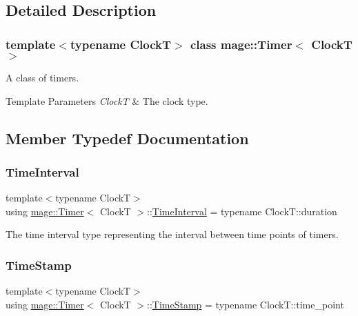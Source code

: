 \subsection{Detailed Description}
\subsubsection*{template$<$typename ClockT$>$\newline
class mage\+::\+Timer$<$ Clock\+T $>$}

A class of timers.


\begin{DoxyTemplParams}{Template Parameters}
{\em ClockT} & The clock type. \\
\hline
\end{DoxyTemplParams}


\subsection{Member Typedef Documentation}
\hypertarget{classmage_1_1_timer_a5c0fd78ceab0110637622bd0e9b8424d}{}\label{classmage_1_1_timer_a5c0fd78ceab0110637622bd0e9b8424d} 
\subsubsection{\texorpdfstring{Time\+Interval}{TimeInterval}}
{\footnotesize\ttfamily template$<$typename ClockT$>$ \\
using \hyperlink{classmage_1_1_timer}{mage\+::\+Timer}$<$ ClockT $>$\+::\hyperlink{classmage_1_1_timer_a5c0fd78ceab0110637622bd0e9b8424d}{Time\+Interval} =  typename Clock\+T\+::duration\hspace{0.3cm}{\ttfamily [private]}}

The time interval type representing the interval between time points of timers. \hypertarget{classmage_1_1_timer_abd11aea6107940b09ef3c48f62c81668}{}\label{classmage_1_1_timer_abd11aea6107940b09ef3c48f62c81668} 
\subsubsection{\texorpdfstring{Time\+Stamp}{TimeStamp}}
{\footnotesize\ttfamily template$<$typename ClockT$>$ \\
using \hyperlink{classmage_1_1_timer}{mage\+::\+Timer}$<$ ClockT $>$\+::\hyperlink{classmage_1_1_timer_abd11aea6107940b09ef3c48f62c81668}{Time\+Stamp} =  typename Clock\+T\+::time\+\_\+point\hspace{0.3cm}{\ttfamily [private]}}

